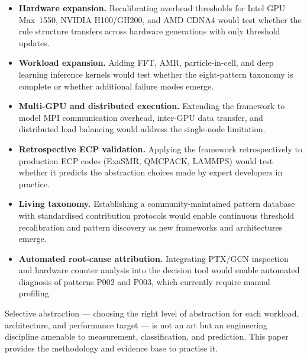 \begin{itemize}
    \item \textbf{Hardware expansion.} Recalibrating overhead thresholds
    for Intel GPU Max~1550, NVIDIA H100/GH200, and AMD CDNA4 would test
    whether the rule structure transfers across hardware generations with
    only threshold updates.

    \item \textbf{Workload expansion.} Adding FFT, AMR, particle-in-cell,
    and deep learning inference kernels would test whether the eight-pattern
    taxonomy is complete or whether additional failure modes emerge.

    \item \textbf{Multi-GPU and distributed execution.} Extending the
    framework to model MPI communication overhead, inter-GPU data transfer,
    and distributed load balancing would address the single-node limitation.

    \item \textbf{Retrospective ECP validation.} Applying the framework
    retrospectively to production ECP codes (ExaSMR, QMCPACK, LAMMPS) would
    test whether it predicts the abstraction choices made by expert
    developers in practice.

    \item \textbf{Living taxonomy.} Establishing a community-maintained
    pattern database with standardised contribution protocols would enable
    continuous threshold recalibration and pattern discovery as new
    frameworks and architectures emerge.

    \item \textbf{Automated root-cause attribution.} Integrating PTX/GCN
    inspection and hardware counter analysis into the decision tool would
    enable automated diagnosis of patterns P002 and P003, which currently
    require manual profiling.
\end{itemize}

\medskip
\noindent Selective abstraction --- choosing the right level of abstraction
for each workload, architecture, and performance target --- is not an art
but an engineering discipline amenable to measurement, classification, and
prediction. This paper provides the methodology and evidence base to
practise it.

